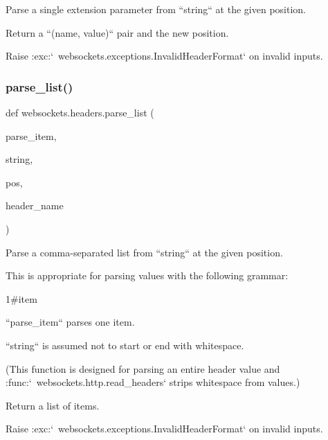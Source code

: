 \begin{DoxyVerb}Parse a single extension parameter from ``string`` at the given position.

Return a ``(name, value)`` pair and the new position.

Raise :exc:`~websockets.exceptions.InvalidHeaderFormat` on invalid inputs.\end{DoxyVerb}
 \mbox{\label{namespacewebsockets_1_1headers_a402e72e1d27761676dd17957a281c88e}} 
\subsubsection{\texorpdfstring{parse\+\_\+list()}{parse\_list()}}
{\footnotesize\ttfamily def websockets.\+headers.\+parse\+\_\+list (\begin{DoxyParamCaption}\item[{}]{parse\+\_\+item,  }\item[{}]{string,  }\item[{}]{pos,  }\item[{}]{header\+\_\+name }\end{DoxyParamCaption})}

\begin{DoxyVerb}Parse a comma-separated list from ``string`` at the given position.

This is appropriate for parsing values with the following grammar:

    1#item

``parse_item`` parses one item.

``string`` is assumed not to start or end with whitespace.

(This function is designed for parsing an entire header value and
:func:`~websockets.http.read_headers` strips whitespace from values.)

Return a list of items.

Raise :exc:`~websockets.exceptions.InvalidHeaderFormat` on invalid inputs.\end{DoxyVerb}
 \mbox{\label{namespacewebsockets_1_1headers_a0326f166bddb44c6571ddb36ce8e410c}} 
